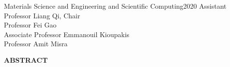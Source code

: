 \documentclass[reqno,12pt,oneside]{report} %
\theoremstyle{plain}
\theoremstyle{definition}
\theoremstyle{remark}
\numberwithin{theorem}{chapter}     %
\begin{document}


{Materials Science and Engineering and Scientific Computing}{2020}
{Assistant Professor Liang Qi, Chair\\
Professor Fei Gao\\
Associate Professor Emmanouil Kioupakis\\
Professor Amit Misra}

\initializefrontsections



\makeatletter
\if@twoside \setcounter{page}{4} \else \setcounter{page}{1} \fi
\makeatother


\startacknowledgementspage

\label{Acknowledgements}

%

\tableofcontents     %
\listoffigures       %
\listoftables        %
\listofabbreviations %

\newpage
\centerline{\large\bf ABSTRACT}
\vspace{0.4in}

\label{Abstract}
\end{document}
